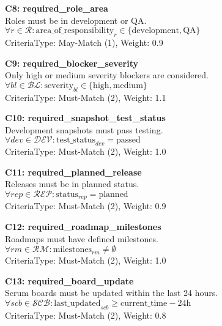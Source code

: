 \documentclass[12pt]{article}
\begin{document}
    \item \textbf{C8: required\_role\_area} \\
    Roles must be in development or QA. \\
    $\forall r \in \mathcal{R}: \text{area\_of\_responsibility}_r \in \{\text{development}, \text{QA}\}$ \\
    CriteriaType: May-Match (1), Weight: 0.9

    \item \textbf{C9: required\_blocker\_severity} \\
    Only high or medium severity blockers are considered. \\
    $\forall bl \in \mathcal{BL}: \text{severity}_{bl} \in \{\text{high}, \text{medium}\}$ \\
    CriteriaType: Must-Match (2), Weight: 1.1

    \item \textbf{C10: required\_snapshot\_test\_status} \\
    Development snapshots must pass testing. \\
    $\forall dev \in \mathcal{DEV}: \text{test\_status}_{dev} = \text{passed}$ \\
    CriteriaType: Must-Match (2), Weight: 1.0

    \item \textbf{C11: required\_planned\_release} \\
    Releases must be in planned status. \\
    $\forall rep \in \mathcal{REP}: \text{status}_{rep} = \text{planned}$ \\
    CriteriaType: Must-Match (2), Weight: 0.9

    \item \textbf{C12: required\_roadmap\_milestones} \\
    Roadmaps must have defined milestones. \\
    $\forall rm \in \mathcal{RM}: \text{milestones}_{rm} \neq \emptyset$ \\
    CriteriaType: Must-Match (2), Weight: 1.0

    \item \textbf{C13: required\_board\_update} \\
    Scrum boards must be updated within the last 24 hours. \\
    $\forall scb \in \mathcal{SCB}: \text{last\_updated}_{scb} \geq \text{current\_time} - 24\text{h}$ \\
    CriteriaType: Must-Match (2), Weight: 0.8
\end{document}
